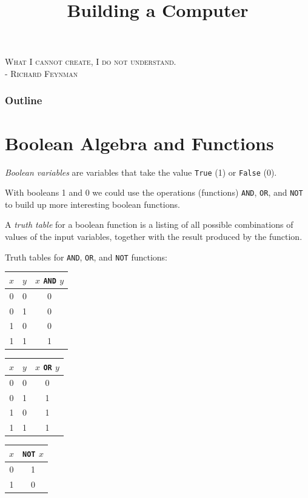 \documentclass[8pt,a4paper,compress,handout]{beamer}
\title{Building a Computer}
\date{}
\begin{document}
\begin{frame}
\begin{flushright}
\tiny \textsc{What I cannot create, I do not understand. \\ - Richard Feynman}
\end{flushright}
\titlepage
\end{frame}

\begin{frame}
\frametitle{Outline}
\tableofcontents
\end{frame}

\section{Boolean Algebra and Functions}
\begin{frame}[fragile]
\emph{Boolean variables} are variables that take the value \lstinline{True} (1) or \lstinline{False} (0).

\bigskip

With booleans 1 and 0 we could use the operations (functions) \lstinline{AND}, \lstinline{OR}, and \lstinline{NOT} to build up more interesting boolean functions.

\bigskip

A \emph{truth table} for a boolean function is a listing of all possible combinations of values of the input variables, together with the result produced by the function.

\bigskip

Truth tables for \lstinline{AND}, \lstinline{OR}, and \lstinline{NOT} functions:

\begin{center}
\begin{tabular}{cc|c}
$x$ & $y$ & $x$ \lstinline$AND$ $y$ \\ \hline
0 & 0 & 0 \\
0 & 1 & 0 \\
1 & 0 & 0 \\
1 & 1 & 1
\end{tabular}\hspace{1cm} \begin{tabular}{cc|c}
$x$ & $y$ & $x$ \lstinline$OR$ $y$ \\ \hline
0 & 0 & 0 \\
0 & 1 & 1 \\
1 & 0 & 1 \\
1 & 1 & 1
\end{tabular}\hspace{1cm} \begin{tabular}{c|c}
$x$ & \lstinline$NOT$ $x$ \\ \hline
0 & 1 \\
1 & 0
\end{tabular}
\end{center}
\end{frame}
\end{document}

